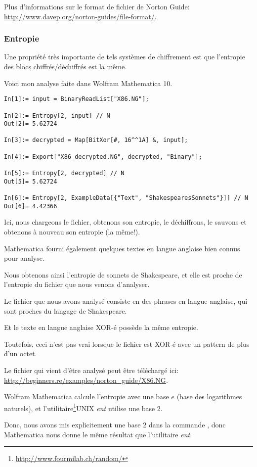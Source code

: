 Plus d'informations sur le format de fichier de Norton Guide: \url{http://www.davep.org/norton-guides/file-format/}.

\subsubsection{Entropie}

Une propriété très importante de tels systèmes de chiffrement est que l'entropie
des blocs chiffrés/déchiffrés est la même.

Voici mon analyse faite dans Wolfram Mathematica 10.

\begin{lstlisting}[caption=Wolfram Mathematica 10,style=custommath]
In[1]:= input = BinaryReadList["X86.NG"];

In[2]:= Entropy[2, input] // N
Out[2]= 5.62724

In[3]:= decrypted = Map[BitXor[#, 16^^1A] &, input];

In[4]:= Export["X86_decrypted.NG", decrypted, "Binary"];

In[5]:= Entropy[2, decrypted] // N
Out[5]= 5.62724

In[6]:= Entropy[2, ExampleData[{"Text", "ShakespearesSonnets"}]] // N
Out[6]= 4.42366
\end{lstlisting}

Ici, nous chargeons le fichier, obtenons son entropie, le déchiffrons, le sauvons
et obtenons à nouveau son entropie (la même!).

Mathematica fourni également quelques textes en langue anglaise bien connus pour
analyse.

Nous obtenons ainsi l'entropie de sonnets de Shakespeare, et elle est proche de l'entropie
du fichier que nous venons d'analyser.

Le fichier que nous avons analysé consiste en des phrases en langue anglaise, qui
sont proches du langage de Shakespeare.

Et le texte en langue anglaise XOR-é possède la même entropie.

Toutefois, ceci n'est pas vrai lorsque le fichier est XOR-é avec un pattern de plus
d'un octet.

Le fichier qui vient d'être analysé peut être téléchargé ici: \url{http://beginners.re/examples/norton_guide/X86.NG}.


\newcommand{\FNENTURL}{\footnote{\url{http://www.fourmilab.ch/random/}}}

Wolfram Mathematica calcule l'entropie avec une base $e$ (base des logarithmes naturels),
et l'utilitaire\FNENTURL UNIX \emph{ent} utilise une base 2.

Donc, nous avons mis explicitement une base 2 dans la commande , donc
Mathematica nous donne le même résultat que l'utilitaire \emph{ent}.

